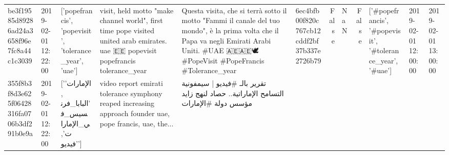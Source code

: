 \begin{tabular}{llllllrlrlll}
be3f19585d89286ad24a3658f96e7fc8a44c1c3039 & 2019-02-01 12:22:00 & ['popefrancis', 'popevisit', 'tolerance_year', 'uae'] & visit, held motto "make channel world", first time pope visited united arab emirates. uae 🇪🇪 popevisit popefrancis tolerance\_year & Questa visita, che si terrà sotto il motto "Fammi il canale del tuo mondo", è la prima volta che il Papa va negli Emirati Arabi Uniti.
\#UAE  🇦🇪🇦🇪🕊
\#PopeVisit
\#PopeFrancis
\#Tolerance\_year & 6ec4bfb00f820c767cb12cddf2bf37b337e2726b79 & False & NaN & False & ['#popefrancis', '#popevisit', '#tolerance_year', '#uae'] & 2019-02-01 12:00:00 & 2019-02-01 13:00:00 \\
355f8b3f8d3e625f06428316fa0706b3df291b0e9a & 2019-02-01 12:22:00 & ['الإمارات', 'البابا_فرنسيس_في_الإمارات', 'فيديو'] & video report emirati tolerance symphony reaped increasing approach founder uae, pope francis, uae, the... & تقرير بالـ \#فيديو | سيمفونية التسامح الإماراتية.. حصاد لنهج زايد مؤسس دولة \#الإمارات


\end{tabular}
